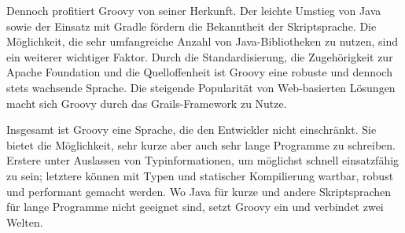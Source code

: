 \documentclass[a4paper]{article}
\begin{document}
Dennoch profitiert Groovy von seiner Herkunft.
Der leichte Umstieg von Java sowie der Einsatz mit Gradle fördern die Bekanntheit der Skriptsprache.
Die Möglichkeit, die sehr umfangreiche Anzahl von Java-Bibliotheken zu nutzen, sind ein weiterer wichtiger Faktor.
Durch die Standardisierung, die Zugehörigkeit zur Apache Foundation und die Quelloffenheit ist Groovy eine robuste und dennoch stets wachsende Sprache.
Die steigende Popularität von Web-basierten Lösungen macht sich Groovy durch das Grails-Framework zu Nutze.

Insgesamt ist Groovy eine Sprache, die den Entwickler nicht einschränkt.
Sie bietet die Möglichkeit, sehr kurze aber auch sehr lange Programme zu schreiben.
Erstere unter Auslassen von Typinformationen, um möglichst schnell einsatzfähig zu sein;
letztere können mit Typen und statischer Kompilierung wartbar, robust und performant gemacht werden.
Wo Java für kurze und andere Skriptsprachen für lange Programme nicht geeignet sind, setzt Groovy ein und verbindet zwei Welten.



\begingroup
	\linespread{0}\selectfont %
	
\endgroup

\end{document}
